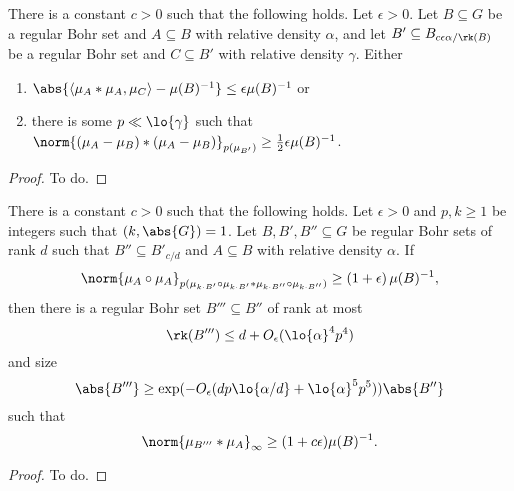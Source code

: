 \begin{proposition}
\label{hoelder-lifting}
There is a constant $c>0$ such that the following holds. Let $\epsilon >0$. Let $B \subseteq G$ be a regular Bohr set and $A\subseteq B$ with relative density $\alpha$, and let $B' \subseteq B_{c\epsilon\alpha/\rk(B)}$ be a regular Bohr set and $C\subseteq B'$ with relative density $\gamma$. Either
\begin{enumerate}
\item $\abs{ \langle \mu_A*\mu_A, \mu_{C} \rangle - \mu(B)^{-1} } \leq \epsilon \mu(B)^{-1}$ or
\item there is some $p \ll\lo{\gamma}$ such that $\norm{ (\mu_A-\mu_B)*(\mu_A-\mu_B)}_{p(\mu_{B'})} \geq \tfrac{1}{2}\epsilon \mu(B)^{-1}$.
\end{enumerate}
\end{proposition}
\begin{proof}
To do.
\end{proof}

\begin{proposition}
\label{prop-it}
There is a constant $c>0$ such that the following holds. Let $\epsilon>0$ and $p,k\geq 1$ be integers such that $(k,\abs{G})=1$. Let $B,B',B''\subseteq G$ be regular Bohr sets of rank $d$ such that $B''\subseteq B'_{c/d}$ and $A\subseteq B$ with relative density $\alpha$. If
    \[ \norm{ \mu_{A}\circ \mu_{A}}_{p(\mu_{k\cdot B'}\circ\mu_{k\cdot B'}\ast \mu_{k\cdot B''}\circ \mu_{k\cdot B''})} \geq \left(1+\epsilon\right) \mu(B)^{-1},\]
    then there is a regular Bohr set $B'''\subseteq B''$ of rank at most
    \[\rk(B''')\leq d+O_{\epsilon}(\lo{\alpha}^4p^4)\]
    and size
    \[\abs{B'''}\geq \exp(-O_{\epsilon}(dp\lo{\alpha/d}+\lo{\alpha}^5p^5))\abs{B''}\]
    such that
    \[ \norm{ \mu_{B'''}*\mu_A }_\infty \geq (1+c\epsilon)\mu(B)^{-1}. \]
\end{proposition}
\begin{proof}
To do.
\end{proof}


